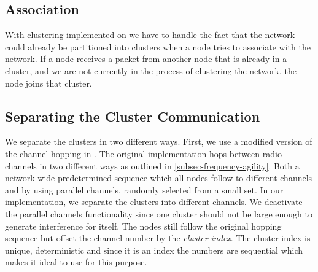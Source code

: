\subsection{Association}


With clustering implemented on \atwo{} we have to handle the fact that the network could already be partitioned into clusters when a node tries to associate with the network. If a node receives a packet from another node that is already in a cluster, and we are not currently in the process of clustering the network, the node joins that cluster. 

\subsection{Separating the Cluster Communication}
\label{subsec:separating-the-clusters}
We separate the clusters in two different ways. First, we use a modified version of the channel hopping in \atwo{}. The original \atwo{} implementation hops between radio channels in two different ways as outlined in \cref{subsec-frequency-agility}. Both a network wide predetermined sequence which all nodes follow to different channels and by using parallel channels, randomly selected from a small set. In our implementation, we separate the clusters into different channels. We deactivate the parallel channels functionality since one cluster should not be large enough to generate interference for itself. The nodes still follow the original hopping sequence but offset the channel number by the \textit{cluster-index}. The cluster-index is unique, deterministic and since it is an index the numbers are sequential which makes it ideal to use for this purpose.

